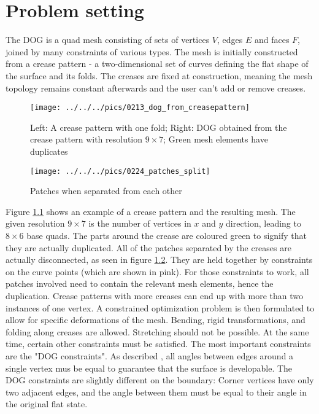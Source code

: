 \documentclass[a4paper,twoside,12pt,nochapterprefix]{scrbook}
\begin{document}
\chapter{Problem setting}\label{sec:problem}
The DOG is a quad mesh consisting of sets of vertices $V$, edges $E$ and faces $F$, joined by many constraints of various types. The mesh is initially constructed from a crease pattern - a two-dimensional set of curves defining the flat shape of the surface and its folds. The creases are fixed at construction, meaning the mesh topology remains constant afterwards and the user can't add or remove creases.\newline
\begin{figure}
    \centering
    \setlength{\tabcolsep}{0.0130\linewidth}
    \texttt{[image: ../../../pics/0213\_dog\_from\_creasepattern]}
    \caption{Left: A crease pattern with one fold; Right: DOG obtained from the crease pattern with resolution $9 \times 7$; Green mesh elements have duplicates
      \label{fig:dog_from_creasepattern}}
\end{figure}
\begin{figure}
    \centering
    \setlength{\tabcolsep}{0.0130\linewidth}
    \texttt{[image: ../../../pics/0224\_patches\_split]}
    \caption{Patches when separated from each other
      \label{fig:patches_split}}
\end{figure}
Figure \ref{fig:dog_from_creasepattern} shows an example of a crease pattern and the resulting mesh. The given resolution $9 \times 7$ is the number of vertices in $x$ and $y$ direction, leading to $8 \times 6$ base quads. The parts around the crease are coloured green to signify that they are actually duplicated. All of the patches separated by the creases are actually disconnected, as seen in figure \ref{fig:patches_split}. They are held together by constraints on the curve points (which are shown in pink). For those constraints to work, all patches involved need to contain the relevant mesh elements, hence the duplication. Crease patterns with more creases can end up with more than two instances of one vertex.\newline
A constrained optimization problem is then formulated to allow for specific deformations of the mesh. Bending, rigid transformations, and folding along creases are allowed. Stretching should not be possible. At the same time, certain other constraints must be satisfied.\newline
The most important constraints are the "DOG constraints". As described \cite{Rabinovich:DogNets:2018}, all angles between edges around a single vertex mus be equal to guarantee that the surface is developable. The DOG constraints are slightly different on the boundary: Corner vertices have only two adjacent edges, and the angle between them must be equal to their angle in the original flat state.
\end{document}
